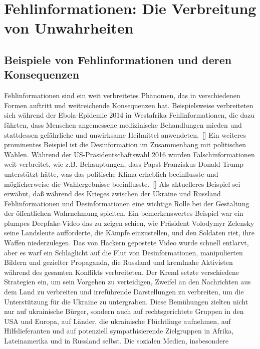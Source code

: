 \documentclass[a4paper,listof=totoc,bibliography=totoc]{scrartcl}
\begin{document}
\section{Fehlinformationen: Die Verbreitung von Unwahrheiten}

\subsection{Beispiele von Fehlinformationen und deren Konsequenzen}

Fehlinformationen sind ein weit verbreitetes Phänomen, das in verschiedenen Formen auftritt und weitreichende Konsequenzen hat. Beispielsweise verbreiteten sich 
während der Ebola-Epidemie 2014 in Westafrika Fehlinformationen, die dazu führten, dass Menschen angemessene medizinische Behandlungen mieden und stattdessen gefährliche 
und unwirksame Heilmittel anwendeten.~[\cite{vinck2019}] 
Ein weiteres prominentes Beispiel ist die Desinformation im Zusammenhang mit politischen Wahlen. Während der US-Präsidentschaftswahl 2016 wurden Falschinformationen weit 
verbreitet, wie z.B. Behauptungen, dass Papst Franziskus Donald Trump unterstützt hätte, was das politische Klima erheblich beeinflusste und möglicherweise die Wahlergebnisse 
beeinflusste.~[\cite{allcott2017}]
\newline
\newline
Als aktuelleres Beispiel sei erwähnt, daß während des Krieges zwischen der Ukraine und Russland Fehlinformationen und Desinformationen eine wichtige Rolle bei der Gestaltung der 
öffentlichen Wahrnehmung spielten. Ein bemerkenswertes Beispiel war ein plumpes Deepfake-Video das zu zeigen schien, wie Präsident Volodymyr Zelensky seine Landsleute aufforderte, die Kämpfe 
einzustellen, und den Soldaten riet, ihre Waffen niederzulegen. Das von Hackern gepostete Video wurde schnell entlarvt, aber es warf ein Schlaglicht 
auf die Flut von Desinformationen, manipulierten Bildern und gezielter Propaganda, die Russland und kremlnahe Aktivisten während des gesamten Konflikts verbreiteten. 
\newline
\newline
Der Kreml setzte verschiedene Strategien ein, um sein Vorgehen zu verteidigen, Zweifel an den Nachrichten aus dem Land zu verbreiten und irreführende Darstellungen zu verbreiten, um die Unterstützung 
für die Ukraine zu untergraben. Diese Bemühungen zielten nicht nur auf ukrainische Bürger, sondern auch auf rechtsgerichtete Gruppen in den USA und Europa, auf Länder, die ukrainische 
Flüchtlinge aufnehmen, auf Hilfslieferanten und auf potenziell sympathisierende Zielgruppen in Afrika, Lateinamerika und in Russland selbst. Die sozialen Medien, insbesondere 
\end{document}
